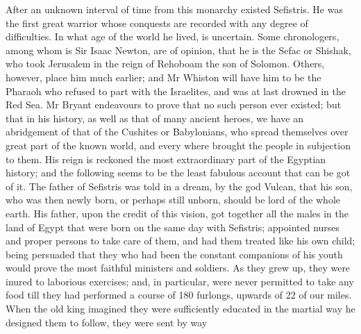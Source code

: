 \documentclass{article}
\begin{document}
After an unknown interval of time from this monarchy existed Sefistris. He was the first great warrior whose conquests are recorded with any degree of difficulties. In what age of the world he lived, is uncertain. Some chronologers, among whom is Sir Isaac Newton, are of opinion, that he is the Sefac or Shishak, who took Jerusalem in the reign of Rehoboam the son of Solomon. Others, however, place him much earlier; and Mr Whiston will have him to be the Pharaoh who refused to part with the Israelites, and was at last drowned in the Red Sea. Mr Bryant endeavours to prove that no such person ever existed; but that in his history, as well as that of many ancient heroes, we have an abridgement of that of the Cushites or Babylonians, who spread themselves over great part of the known world, and every where brought the people in subjection to them. His reign is reckoned the most extraordinary part of the Egyptian history; and the following seems to be the least fabulous account that can be got of it. The father of Sefistris was told in a dream, by the god Vulcan, that his son, who was then newly born, or perhaps still unborn, should be lord of the whole earth. His father, upon the credit of this vision, got together all the males in the land of Egypt that were born on the same day with Sefistris; appointed nurses and proper persons to take care of them, and had them treated like his own child; being persuaded that they who had been the constant companions of his youth would prove the most faithful ministers and soldiers. As they grew up, they were inured to laborious exercises; and, in particular, were never permitted to take any food till they had performed a course of 180 furlongs, upwards of 22 of our miles. When the old king imagined they were sufficiently educated in the martial way he designed them to follow, they were sent by way
\end{document}
